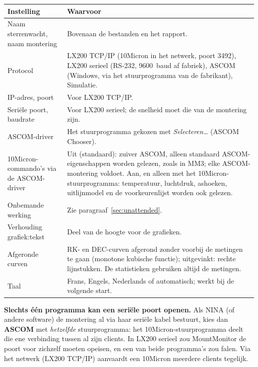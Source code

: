 
\begin{center}
\begin{tabularx}{\textwidth}{lX}
\toprule
\textbf{Instelling} & \textbf{Waarvoor} \\
\midrule
Naam sterrenwacht, naam montering & Bovenaan de bestanden en het rapport. \\
Protocol & LX200 TCP/IP (10Micron in het netwerk, poort 3492), LX200 serieel
(RS-232, 9600~baud af fabriek), ASCOM (Windows, via het stuurprogramma van de
fabrikant), Simulatie. \\
IP-adres, poort & Voor LX200 TCP/IP. \\
Seriële poort, baudrate & Voor LX200 serieel; de snelheid moet die van de
montering zijn. \\
ASCOM-driver & Het stuurprogramma gekozen met \emph{Selecteren\ldots}
(ASCOM Chooser). \\
10Micron-commando's via de ASCOM-driver & Uit (standaard): zuiver ASCOM, alleen
standaard ASCOM-eigenschappen worden gelezen, zoals in MM3; elke
ASCOM-montering voldoet. Aan, en alleen met het 10Micron-stuurprogramma:
temperatuur, luchtdruk, ashoeken, uitlijnmodel en de voorkeurenlijst worden
ook gelezen. \\
Onbemande werking & Zie paragraaf~\ref{sec:unattended}. \\
Verhouding grafiek:tekst & Deel van de hoogte voor de grafieken. \\
Afgeronde curven & RK- en DEC-curven afgerond zonder voorbij de metingen te
gaan (monotone kubische functie); uitgevinkt: rechte lijnstukken. De
statistieken gebruiken altijd de metingen. \\
Taal & Frans, Engels, Nederlands of automatisch; werkt bij de volgende
start. \\
\bottomrule
\end{tabularx}
\end{center}

\begin{warning}
\textbf{Slechts één programma kan een seriële poort openen.} Als NINA (of andere
software) de montering al via haar seriële kabel bestuurt, kies dan
\textbf{ASCOM} met \emph{hetzelfde} stuurprogramma: het 10Micron-stuurprogramma
deelt die ene verbinding tussen al zijn clients. In LX200 serieel zou
MountMonitor de poort voor zichzelf moeten opeisen, en een van beide programma's
zou falen. Via het netwerk (LX200 TCP/IP) aanvaardt een 10Micron meerdere
clients tegelijk.
\end{warning}

